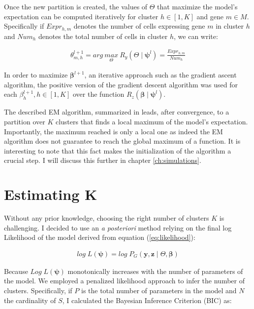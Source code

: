 Once the new partition is created, the values of $\Theta$ that maximize the model's expectation can be computed iteratively for cluster $h \in [1,K]$ and gene $m \in M$. Specifically if $Expr_{h,m}$ denotes the number of cells expressing gene $m$ in cluster $h$ and $Num_h$ denotes the total number of cells in cluster $h$, we can write:

\begin{align*}
\theta_{m,h}^{l+1} = arg\:\underset{\Theta}{max}\:R_y(\Theta\mid \boldsymbol{\psi}^l) = \frac{Expr_{h,m}}{Num_h}
\end{align*}

In order to maximize $\boldsymbol{\beta}^{l+1}$, an iterative approach such as the gradient ascent algorithm, the positive version of the gradient descent algorithm \cite{burges2005} was used for each $\beta_h^{l+1}, h \in [1,K]$ over the function $R_z(\boldsymbol{\beta}\mid \boldsymbol{\psi}^l)$. \\


The described EM algorithm, summarized in  leads, after convergence, to a partition over $K$ clusters that finds a local maximum of the model's expectation. Importantly, the maximum reached is only a local one as indeed the EM algorithm does not guarantee to reach the global maximum of a function. It is interesting to note that this fact makes the initialization of the algorithm a crucial step. I will discuss this further in chapter \ref{ch:simulations}.\\


\section{Estimating K}
Without any prior knowledge, choosing the right number of clusters $K$ is challenging. I decided to use an {\it{a posteriori}} method relying on the final log Likelihood of the model derived from equation (\ref{eq:likelihood}):

\begin{align*}
log\;L(\boldsymbol{\psi}) = 	log\;P_G(\boldsymbol{y},\boldsymbol{z} \mid \Theta, \boldsymbol{\beta})
\end{align*}

Because $Log\;L(\boldsymbol{\psi})$ monotonically increases with the number of parameters of the model. We employed a penalized likelihood approach to infer the number of clusters. Specifically, if $P$ is the total number of parameters in the model and $N$ the cardinality of $S$, I calculated the Bayesian Inference Criterion (BIC) as:

